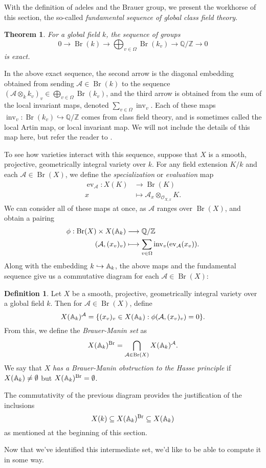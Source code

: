 \documentclass[12pt,twoside]{reedthesis}
\theoremstyle{plain}
\newtheorem{theorem}{Theorem}[chapter]
\theoremstyle{definition}
\newtheorem{definition}{Definition}[section]
\theoremstyle{remark}
\newcommand{\ZZ}{\mathbb{Z}}
\newcommand{\Affine}{\mathbb{A}}
\newcommand{\QQ}{\mathbb{Q}}
\newcommand{\calA}{\mathcal{A}}
\newcommand{\calO}{\mathcal{O}}
\newcommand{\Br}{\operatorname{Br}}
\newcommand{\adele}{\reflectbox{$\Affine$}}
\newcommand{\ev}{\operatorname{ev}}
\newcommand{\inv}{\operatorname{inv}}
\begin{document}
With the definition of adeles and the Brauer group, we present the workhorse of this section, the so-called \emph{fundamental sequence of global class field theory}.
\begin{theorem} For a global field $k$, the sequence of groups
\[
0\longrightarrow \Br(k)\longrightarrow \bigoplus_{v\in\Omega}\Br(k_v)\longrightarrow \QQ/\ZZ\longrightarrow0
\]
is exact.
\end{theorem}
\noindent In the above exact sequence, the second arrow is the diagonal embedding obtained from sending $\calA\in\Br(k)$ to the sequence $(\calA\otimes_k k_v)_v\in\bigoplus_{v\in\Omega}\Br(k_v)$, and the third arrow is obtained from the sum of the local invariant maps, denoted $\sum_{v\in\Omega} \inv_v$. Each of these maps $\inv_v:\Br(k_v)\hookrightarrow\QQ/\ZZ$ comes from class field theory, and is sometimes called the local Artin map, or local invariant map. We will not include the details of this map here, but refer the reader to \cite{milneCFT}.

To see how varieties interact with this sequence, suppose that $X$ is a smooth, projective, geometrically integral variety over $k$. For any field extension $K/k$ and each $\calA\in\Br(X)$, we define the \emph{specialization} or \emph{evaluation} map
\begin{align*}
\ev_\calA:X(K)&\longrightarrow\Br(K)\\
x&\longmapsto\calA_x\otimes_{\calO_{X,x}}K.
\end{align*}
We can consider all of these maps at once, as $\calA$ ranges over $\Br(X)$, and obtain a pairing
\begin{align*}
\phi:\Br(X)\times X(\adele_k)&\longrightarrow\QQ/\ZZ\\
(\calA,(x_v)_v)&\longmapsto\sum_{v\in\Omega}\inv_v(\ev_\calA(x_v)).
\end{align*}
Along with the embedding $k\hookrightarrow\adele_k$, the above maps and the fundamental sequence give us a commutative diagram for each $\calA\in\Br(X)$:
\begin{figure}[h]
\centering
{}
\end{figure}
\begin{definition}
Let $X$ be a smooth, projective, geometrically integral variety over a global field $k$. Then for $\calA\in\Br(X)$, define 
\[
X(\adele_k)^\calA=\{(x_v)_v\in X(\adele_k):\phi(\calA,(x_v)_v)=0\}.
\]
From this, we define the \emph{Brauer-Manin set} as
\[
X(\adele_k)^{\Br}=\bigcap_{\calA\in\Br(X)}X(\adele_k)^\calA.
\]
We say that $X$ \emph{has a Brauer-Manin obstruction to the Hasse principle} if $X(\adele_k)\neq\emptyset$ but $X(\adele_k)^{\Br}=\emptyset$.
\end{definition}
\noindent The commutativity of the previous diagram provides the justification of the inclusions
\[
X(k)\subseteq X(\adele_k)^{\Br}\subseteq X(\adele_k)
\]
as mentioned at the beginning of this section.

Now that we've identified this intermediate set, we'd like to be able to compute it in some way. 
\backmatter 
\nocite{*}



\end{document}
